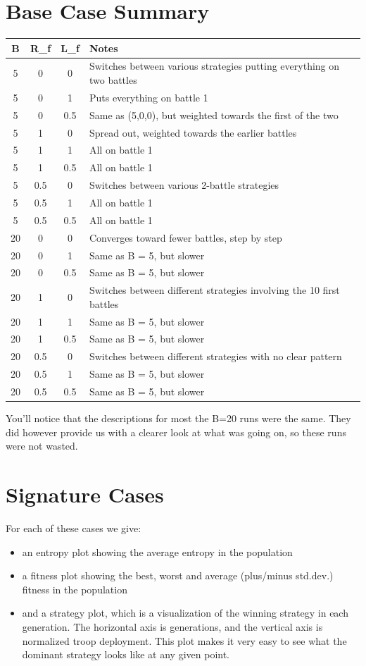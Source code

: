 \documentclass[a4paper,12pt]{article}
\begin{document}
\section{Base Case Summary}
\begin{tabular}{|c|c|c|l|}
\hline
B & R_{f} & L_{f} & Notes \\
\hline \hline
5 & 0 & 0 & Switches between various strategies putting everything on two battles \\
5 & 0 & 1 & Puts everything on battle 1 \\
5 & 0 & 0.5 & Same as (5,0,0), but weighted towards the first of the two \\
5 & 1 & 0 & Spread out, weighted towards the earlier battles \\
5 & 1 & 1 &  All on battle 1 \\
5 & 1 & 0.5 & All on battle 1 \\
5 & 0.5 & 0 & Switches between various 2-battle strategies \\
5 & 0.5 & 1 & All on battle 1 \\
5 & 0.5 & 0.5 & All on battle 1 \\
20 & 0 & 0 & Converges toward fewer battles, step by step \\
20 & 0 & 1 & Same as B = 5, but slower\\
20 & 0 & 0.5 & Same as B = 5, but slower \\
20 & 1 & 0 & Switches between different strategies involving the 10 first battles \\
20 & 1 & 1 & Same as B = 5, but slower \\
20 & 1 & 0.5 & Same as B = 5, but slower \\
20 & 0.5 & 0 & Switches between different strategies with no clear pattern \\
20 & 0.5 & 1 & Same as B = 5, but slower \\
20 & 0.5 & 0.5 & Same as B = 5, but slower \\
\hline
\end{tabular}
You'll notice that the descriptions for most the B=20 runs were the same. They did however provide us with a clearer look at what was going on, so these runs were not wasted.

\section{Signature Cases}
For each of these cases we give:
\begin{itemize}
\item{an entropy plot showing the average entropy in the population}
\item{a fitness plot showing the best, worst and average (plus/minus std.dev.) fitness in the population} 
\item{and a strategy plot, which is a visualization of the winning strategy in each generation. The horizontal axis is generations, and the vertical axis is normalized troop deployment. This plot makes it very easy to see what the dominant strategy looks like at any given point.}
\end{itemize}
\end{document}
